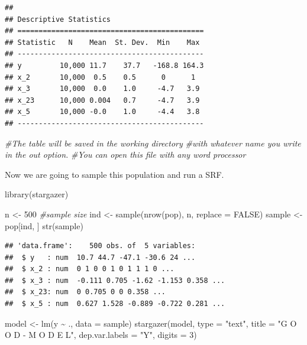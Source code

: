 \documentclass[
]{book}
\newenvironment{Shaded}{\begin{snugshade}}{\end{snugshade}}
\newcommand{\AttributeTok}[1]{\textcolor[rgb]{0.77,0.63,0.00}{#1}}
\newcommand{\CommentTok}[1]{\textcolor[rgb]{0.56,0.35,0.01}{\textit{#1}}}
\newcommand{\ConstantTok}[1]{\textcolor[rgb]{0.00,0.00,0.00}{#1}}
\newcommand{\DecValTok}[1]{\textcolor[rgb]{0.00,0.00,0.81}{#1}}
\newcommand{\FunctionTok}[1]{\textcolor[rgb]{0.00,0.00,0.00}{#1}}
\newcommand{\NormalTok}[1]{#1}
\newcommand{\OtherTok}[1]{\textcolor[rgb]{0.56,0.35,0.01}{#1}}
\newcommand{\SpecialCharTok}[1]{\textcolor[rgb]{0.00,0.00,0.00}{#1}}
\newcommand{\StringTok}[1]{\textcolor[rgb]{0.31,0.60,0.02}{#1}}
\theoremstyle{definition}
\theoremstyle{definition}
\theoremstyle{definition}
\theoremstyle{definition}
\theoremstyle{remark}
\begin{document}
\begin{verbatim}
## 
## Descriptive Statistics
## ============================================
## Statistic   N    Mean  St. Dev.  Min    Max 
## --------------------------------------------
## y         10,000 11.7    37.7   -168.8 164.3
## x_2       10,000  0.5    0.5      0      1  
## x_3       10,000  0.0    1.0     -4.7   3.9 
## x_23      10,000 0.004   0.7     -4.7   3.9 
## x_5       10,000 -0.0    1.0     -4.4   3.8 
## --------------------------------------------
\end{verbatim}

\begin{Shaded}
\begin{Highlighting}[]
\CommentTok{\#The table will be saved in the working directory}
\CommentTok{\#with whatever name you write in the out option.}
\CommentTok{\#You can open this file with any word processor}
\end{Highlighting}
\end{Shaded}

Now we are going to sample this population and run a SRF.

\begin{Shaded}
\begin{Highlighting}[]
\FunctionTok{library}\NormalTok{(stargazer)}

\NormalTok{n }\OtherTok{\textless{}{-}} \DecValTok{500} \CommentTok{\#sample size}
\NormalTok{ind }\OtherTok{\textless{}{-}} \FunctionTok{sample}\NormalTok{(}\FunctionTok{nrow}\NormalTok{(pop), n, }\AttributeTok{replace =} \ConstantTok{FALSE}\NormalTok{)}
\NormalTok{sample }\OtherTok{\textless{}{-}}\NormalTok{ pop[ind, ]}
\FunctionTok{str}\NormalTok{(sample)}
\end{Highlighting}
\end{Shaded}

\begin{verbatim}
## 'data.frame':    500 obs. of  5 variables:
##  $ y   : num  10.7 44.7 -47.1 -30.6 24 ...
##  $ x_2 : num  0 1 0 0 1 0 1 1 1 0 ...
##  $ x_3 : num  -0.111 0.705 -1.62 -1.153 0.358 ...
##  $ x_23: num  0 0.705 0 0 0.358 ...
##  $ x_5 : num  0.627 1.528 -0.889 -0.722 0.281 ...
\end{verbatim}

\begin{Shaded}
\begin{Highlighting}[]
\NormalTok{model }\OtherTok{\textless{}{-}} \FunctionTok{lm}\NormalTok{(y }\SpecialCharTok{\textasciitilde{}}\NormalTok{ ., }\AttributeTok{data =}\NormalTok{ sample)}
\FunctionTok{stargazer}\NormalTok{(model, }\AttributeTok{type =} \StringTok{"text"}\NormalTok{, }\AttributeTok{title =} \StringTok{"G O O D {-}  M O D E L"}\NormalTok{,}
          \AttributeTok{dep.var.labels =} \StringTok{"Y"}\NormalTok{,}
          \AttributeTok{digits =} \DecValTok{3}\NormalTok{)}
\end{Highlighting}
\end{Shaded}
\end{document}
